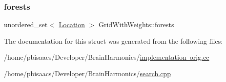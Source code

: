 \subsubsection{\texorpdfstring{forests}{forests}}
{\footnotesize\ttfamily unordered\+\_\+set$<$ \mbox{\hyperlink{structSquareGrid_a2c9a2cbd3912aa48ac97289abc3f1c0f}{Location}} $>$ Grid\+With\+Weights\+::forests}



The documentation for this struct was generated from the following files\+:\begin{DoxyCompactItemize}
\item 
/home/pbisaacs/\+Developer/\+Brain\+Harmonics/\mbox{\hyperlink{implementation_01orig_8cc}{implementation orig.\+cc}}\item 
/home/pbisaacs/\+Developer/\+Brain\+Harmonics/\mbox{\hyperlink{search_8cpp}{search.\+cpp}}\end{DoxyCompactItemize}
